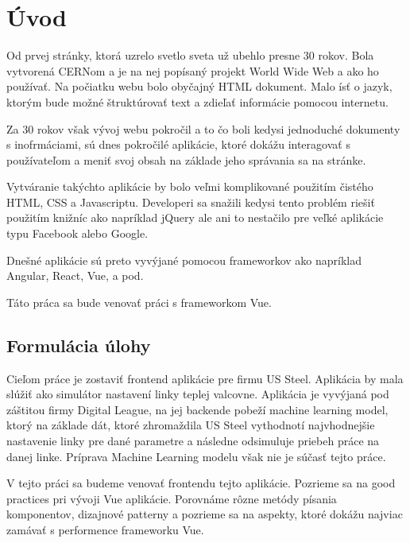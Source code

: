 
{}

\chapter*{Úvod}

Od prvej stránky, ktorá uzrelo svetlo sveta už ubehlo presne 30 rokov. Bola vytvorená CERNom a je na nej popísaný projekt World Wide Web a ako ho používať. Na počiatku webu bolo obyčajný HTML dokument. Malo ísť o jazyk, ktorým bude možné štruktúrovať text a zdieľať informácie pomocou internetu.

Za 30 rokov však vývoj webu pokročil a to čo boli kedysi jednoduché dokumenty s inofrmáciami, sú dnes pokročilé aplikácie, ktoré dokážu interagovať s používateľom a meniť svoj obsah na základe jeho správania sa na stránke.

Vytváranie takýchto aplikácie by bolo veľmi komplikované použitím čistého HTML, CSS a Javascriptu. Developeri sa snažili kedysi tento problém riešiť použitím knižníc ako napríklad jQuery ale ani to nestačilo pre veľké aplikácie typu Facebook alebo Google.

Dnešné aplikácie sú preto vyvýjané pomocou frameworkov ako napríklad Angular, React, Vue, a pod. 

Táto práca sa bude venovať práci s frameworkom Vue. 


\section*{Formulácia úlohy}

Cieľom práce je zostaviť frontend aplikácie pre firmu US Steel. Aplikácia by mala slúžiť ako simulátor nastavení linky teplej valcovne. Aplikácia je vyvýjaná pod záštitou firmy Digital League, na jej backende pobeží machine learning model, ktorý na základe dát, ktoré zhromaždila US Steel vythodnotí najvhodnejšie nastavenie linky pre dané parametre a následne odsimuluje priebeh práce na danej linke. Príprava Machine Learning modelu však nie je súčasť tejto práce.

V tejto práci sa budeme venovať frontendu tejto aplikácie. Pozrieme sa na good practices pri vývoji Vue aplikácie. Porovnáme rôzne metódy písania komponentov, dizajnové patterny a pozrieme sa na aspekty, ktoré dokážu najviac zamávať s performence frameworku Vue. 

